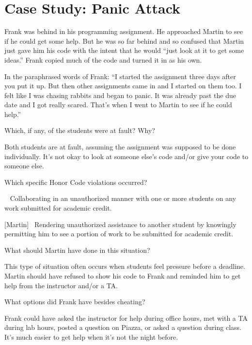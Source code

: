 \section*{Case Study: Panic Attack}

Frank was behind in his programming assignment.
He approached Martin to see if he could get some help.
But he was so far behind and so confused that Martin just gave him his code with the intent that he would ``just look at it to get some ideas.''
Frank copied much of the code and turned it in as his own.

\vspace{1em}

In the paraphrased words of Frank: ``I started the assignment three days after you put it up.
But then other assignments came in and I started on them too.
I felt like I was chasing rabbits and began to panic.
It was already past the due date and I got really scared.
That's when I went to Martin to see if he could help.''




\Q Which, if any, of the students were at fault? Why?

\begin{answer}[6em]
Both students are at fault, assuming the assignment was supposed to be done individually.
It's not okay to look at someone else's code and/or give your code to someone else.
\end{answer}


\Q Which specific Honor Code violations occurred?

\begin{answer}[7em]
[Frank]~ Collaborating in an unauthorized manner with one or more students on any work submitted for academic credit.

\bigskip

[Martin]~ Rendering unauthorized assistance to another student by knowingly permitting him to see a portion of work to be submitted for academic credit.
\end{answer}


\Q What should Martin have done in this situation?

\begin{answer}[6em]
This type of situation often occurs when students feel pressure before a deadline.
Martin should have refused to show his code to Frank and reminded him to get help from the instructor and/or a TA.
\end{answer}


\Q What options did Frank have besides cheating?

\begin{answer}[6em]
Frank could have asked the instructor for help during office hours, met with a TA during lab hours, posted a question on Piazza, or asked a question during class.
It's much easier to get help when it's not the night before.
\end{answer}
